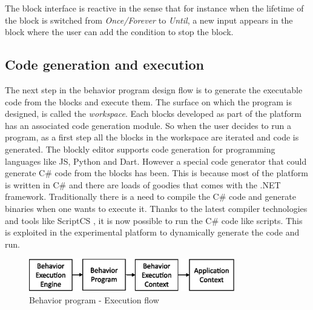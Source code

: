 The block interface is reactive in the sense that for instance when the lifetime of the block is switched from \emph{Once/Forever} to \emph{Until}, a new input appears in the block where the user can add the condition to stop the block.

\subsection{Code generation and execution}
The next step in the behavior program design flow is to generate the executable code from the blocks and execute them. The surface on which the program is designed, is called the \emph{workspace}. Each blocks developed as part of the platform has an associated code generation module. So when the user decides to run a program, as a first step all the blocks in the workspace are iterated and code is generated. The blockly editor supports code generation for programming languages like JS, Python and Dart. However a special code generator that could generate C\# code from the blocks has been. This is because most of the platform is written in C\# and there are loads of goodies that comes with the .NET framework. Traditionally there is a need to compile the C\# code and generate binaries when one wants to execute it. Thanks to the latest compiler technologies and tools like ScriptCS \cite{ScriptCS}, it is now possible to run the C\# code like scripts. This is exploited in the experimental platform to dynamically generate the code and run.
\begin{figure}[H]
\centering
\includegraphics[width=0.8\textwidth]{../thesis/assets/execution_flow.eps}
\caption[Behavior program - Execution flow]{Behavior program - Execution flow}
\label{fig:program_execution}
\end{figure}

